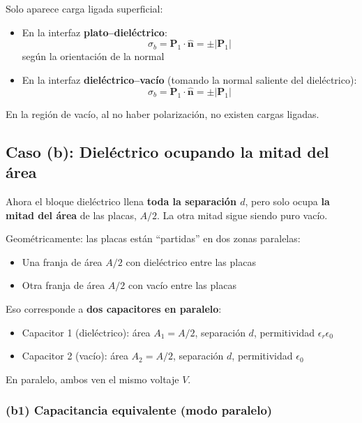 \documentclass{article}
\begin{document}
Solo aparece carga ligada superficial:

\begin{itemize}
  \item En la interfaz \textbf{plato–dieléctrico}:
    \[
    \sigma_{b} = \mathbf{P}_{1}\cdot\hat{\mathbf{n}}
    = \pm |\mathbf{P}_{1}|
    \]
    según la orientación de la normal
  \item En la interfaz \textbf{dieléctrico–vacío} (tomando la normal saliente del dieléctrico):
    \[
    \sigma_{b} = \mathbf{P}_{1}\cdot\hat{\mathbf{n}}
    = \pm |\mathbf{P}_{1}|
    \]
\end{itemize}

En la región de vacío, al no haber polarización, no existen cargas ligadas.

\subsection*{Caso (b): Dieléctrico ocupando la mitad del área}

Ahora el bloque dieléctrico llena \textbf{toda la separación $d$}, pero solo ocupa \textbf{la mitad del área} de las placas, $A/2$.  
La otra mitad sigue siendo puro vacío.

Geométricamente: las placas están “partidas” en dos zonas paralelas:
\begin{itemize}
  \item Una franja de área $A/2$ con dieléctrico entre las placas
  \item Otra franja de área $A/2$ con vacío entre las placas
\end{itemize}

Eso corresponde a \textbf{dos capacitores en paralelo}:
\begin{itemize}
  \item Capacitor 1 (dieléctrico): área $A_{1} = A/2$, separación $d$, permitividad $\epsilon_{r}\epsilon_{0}$
  \item Capacitor 2 (vacío): área $A_{2} = A/2$, separación $d$, permitividad $\epsilon_{0}$
\end{itemize}

En paralelo, ambos ven el mismo voltaje $V$.

\subsubsection*{(b1) Capacitancia equivalente (modo paralelo)}
\end{document}
